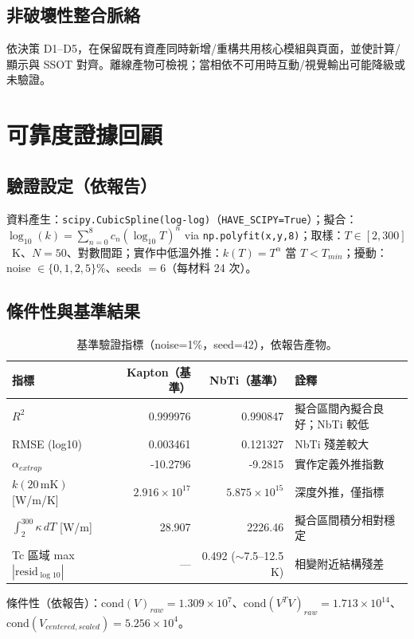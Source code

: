 \documentclass[11pt,a4paper]{article}
\begin{document}
\subsection{非破壞性整合脈絡}
依決策 D1--D5，在保留既有資產同時新增/重構共用核心模組與頁面，並使計算/顯示與 SSOT 對齊。離線產物可檢視；當相依不可用時互動/視覺輸出可能降級或未驗證。

\section{可靠度證據回顧}
\subsection{驗證設定（依報告）}
資料產生：\texttt{scipy.CubicSpline(log-log)}（\texttt{HAVE\_SCIPY=True}）；擬合：$\log_{10}(k)=\sum_{n=0}^{8} c_n (\log_{10}T)^n$ via \texttt{np.polyfit(x,y,8)}；取樣：$T\in[2,300]$~K、$N=50$、對數間距；實作中低溫外推：$k(T)=T^\alpha$ 當 $T<T_{min}$；擾動：noise $\in\{0,1,2,5\}\%$、seeds $=6$（每材料 24 次）。

\subsection{條件性與基準結果}
\begin{table}[h]
\centering
\begin{tabular}{@{}lrrp{4.6cm}@{}}
\toprule
指標 & Kapton（基準） & NbTi（基準） & 詮釋 \\
\midrule
$R^2$ & 0.999976 & 0.990847 & 擬合區間內擬合良好；NbTi 較低 \\
RMSE (log10) & 0.003461 & 0.121327 & NbTi 殘差較大 \\
$\alpha_{extrap}$ & -10.2796 & -9.2815 & 實作定義外推指數 \\
$k(20\,\mathrm{mK})$ [W/m/K] & $2.916\times10^{17}$ & $5.875\times10^{15}$ & 深度外推，僅指標 \\
$\int_{2}^{300}\kappa\,dT$ [W/m] & 28.907 & 2226.46 & 擬合區間積分相對穩定 \\
Tc 區域 max $|\mathrm{resid}_{\log10}|$ & --- & 0.492 ($\sim$7.5--12.5 K) & 相變附近結構殘差 \\
\bottomrule
\end{tabular}
\caption{基準驗證指標（noise=1\%，seed=42），依報告產物。}
\end{table}

條件性（依報告）：$\mathrm{cond}(V)_{raw}=1.309\times10^7$、$\mathrm{cond}(V^T V)_{raw}=1.713\times10^{14}$、$\mathrm{cond}(V_{centered,scaled})=5.256\times10^4$。
\end{document}
